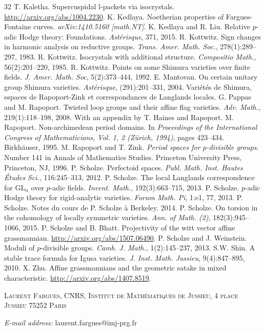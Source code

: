 \begin{thebibliography}{32}
 T. Kaletha. Supercuspidal l-packets via isocrystals. \url{http://arxiv.org/abs/1004.2230}.
 K. Kedlaya. Noetherian properties of Fargues-Fontaine curves. \textit{arXiv:1410.5160 [math.NT]}.
 K. Kedlaya and R. Liu. Relative $p$-adic Hodge theory: Foundations. \textit{Astérisque}, 371, 2015.
 R. Kottwitz. Sign changes in harmonic analysis on reductive groups. \textit{Trans. Amer. Math. Soc.}, 278(1):289--297, 1983.
 R. Kottwitz. Isocrystals with additional structure. \textit{Compositio Math.}, 56(2):201--220, 1985.
 R. Kottwitz. Points on some Shimura varieties over finite fields. \textit{J. Amer. Math. Soc}, 5(2):373--444, 1992.
 E. Mantovan. On certain unitary group Shimura varieties. \textit{Astérisque}, (291):201--331, 2004. Variétés de Shimura, espaces de Rapoport-Zink et correspondances de Langlands locales.
 G. Pappas and M. Rapoport. Twisted loop groups and their affine flag varieties. \textit{Adv. Math.}, 219(1):118--198, 2008. With an appendix by T. Haines and Rapoport.
 M. Rapoport. Non-archimedean period domains. In \textit{Proceedings of the International Congress of Mathematicians, Vol. 1, 2 (Zürich, 1994)}, pages 423--434. Birkhäuser, 1995.
 M. Rapoport and T. Zink. \textit{Period spaces for $p$-divisible groups}. Number 141 in Annals of Mathematics Studies. Princeton University Press, Princeton, NJ, 1996.
 P. Scholze. Perfectoid spaces. \textit{Publ. Math. Inst. Hautes Études Sci.}, 116:245--313, 2012.
 P. Scholze. The local Langlands correspondence for $\mathrm{GL}_n$ over $p$-adic fields. \textit{Invent. Math.}, 192(3):663--715, 2013.
 P. Scholze. $p$-adic Hodge theory for rigid-analytic varieties. \textit{Forum Math. Pi}, 1:e1, 77, 2013.
 P. Scholze. Notes du cours de P. Scholze à Berkeley. 2014.
 P. Scholze. On torsion in the cohomology of locally symmetric varieties. \textit{Ann. of Math. (2)}, 182(3):945--1066, 2015.
 P. Scholze and B. Bhatt. Projectivity of the witt vector affine grassmannian. \url{http://arxiv.org/abs/1507.06490}.
 P. Scholze and J. Weinstein. Moduli of $p$-divisible groups. \textit{Camb. J. Math.}, 1(2):145--237, 2013.
 S.W. Shin. A stable trace formula for Igusa varieties. \textit{J. Inst. Math. Jussieu}, 9(4):847--895, 2010.
 X. Zhu. Affine grassmannians and the geometric satake in mixed characteristic. \url{http://arxiv.org/abs/1407.8519}.

\end{thebibliography}

\par\medskip
\noindent\textsc{Laurent Fargues, CNRS, Institut de Mathématiques de Jussieu, 4 place Jussieu 75252 Paris}

\noindent\textit{E-mail address:} laurent.fargues@imj-prg.fr
